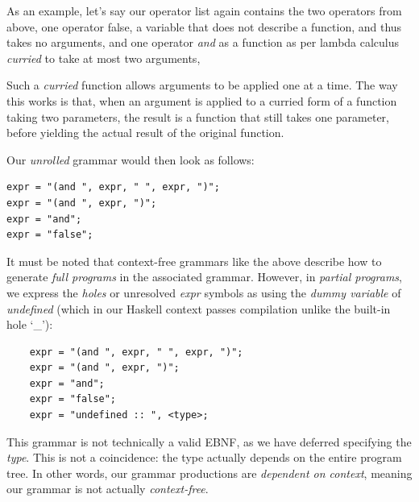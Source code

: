 \documentclass{article}
\begin{document}
As an example, let's say our operator list again contains the two operators from above,
one operator false, a variable that does not describe a function, and thus takes no arguments,
and one operator \emph{and} as a function as per lambda calculus \emph{curried} to take at most two arguments,

Such a \emph{curried} function allows arguments to be applied one at a time.
The way this works is that, when an argument is applied to a curried form of a function taking two parameters,
the result is a function that still takes one parameter, before yielding the actual result of the original function.

Our \emph{unrolled} grammar would then look as follows:%
    


\begin{verbatim}
expr = "(and ", expr, " ", expr, ")";
expr = "(and ", expr, ")";
expr = "and";
expr = "false";
\end{verbatim}

It must be noted that context-free grammars like the above
describe how to generate \emph{full programs} in the associated grammar.
However,
in \emph{partial programs},
we express the \emph{holes} or unresolved \emph{expr} symbols as
using the \emph{dummy variable} of \emph{undefined}
(which in our Haskell context passes compilation unlike the built-in hole `\_'):

\begin{verbatim}
    expr = "(and ", expr, " ", expr, ")";
    expr = "(and ", expr, ")";
    expr = "and";
    expr = "false";
    expr = "undefined :: ", <type>;
\end{verbatim}

This grammar is not technically a valid EBNF,
as we have deferred specifying the \emph{type}.
This is not a coincidence: the type actually depends on the entire program tree.
In other words, our grammar productions are \emph{dependent on context},
meaning our grammar is not actually \emph{context-free}.
\end{document}
